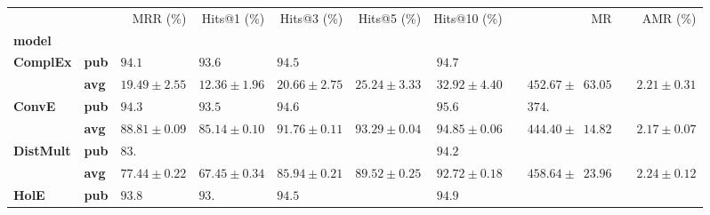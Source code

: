 \begin{tabular}{llrrrrrrr}
\toprule
       &     &                    MRR (\%) &                 Hits@1 (\%) &                 Hits@3 (\%) &                 Hits@5 (\%) &                Hits@10 (\%) &                                         MR &                     AMR (\%) \\
\textbf{model} & {} &                             &                             &                             &                             &                             &                                            &                              \\
\midrule
\textbf{ComplEx} & \textbf{pub} &  $94.1\phantom{0 \pm 0.00}$ &  $93.6\phantom{0 \pm 0.00}$ &  $94.5\phantom{0 \pm 0.00}$ &                             &  $94.7\phantom{0 \pm 0.00}$ &                                            &                              \\
       & \textbf{avg} &            $19.49 \pm 2.55$ &            $12.36 \pm 1.96$ &            $20.66 \pm 2.75$ &            $25.24 \pm 3.33$ &            $32.92 \pm 4.40$ &  $\phantom{00}452.67 \pm \phantom{0}63.05$ &  $\phantom{00}2.21 \pm 0.31$ \\\midrule
\textbf{ConvE} & \textbf{pub} &  $94.3\phantom{0 \pm 0.00}$ &  $93.5\phantom{0 \pm 0.00}$ &  $94.6\phantom{0 \pm 0.00}$ &                             &  $95.6\phantom{0 \pm 0.00}$ &  $\phantom{00}374.\phantom{00 \pm 000.00}$ &                              \\
       & \textbf{avg} &            $88.81 \pm 0.09$ &            $85.14 \pm 0.10$ &            $91.76 \pm 0.11$ &            $93.29 \pm 0.04$ &            $94.85 \pm 0.06$ &  $\phantom{00}444.40 \pm \phantom{0}14.82$ &  $\phantom{00}2.17 \pm 0.07$ \\\midrule
\textbf{DistMult} & \textbf{pub} &  $83.\phantom{00 \pm 0.00}$ &                             &                             &                             &  $94.2\phantom{0 \pm 0.00}$ &                                            &                              \\
       & \textbf{avg} &            $77.44 \pm 0.22$ &            $67.45 \pm 0.34$ &            $85.94 \pm 0.21$ &            $89.52 \pm 0.25$ &            $92.72 \pm 0.18$ &  $\phantom{00}458.64 \pm \phantom{0}23.96$ &  $\phantom{00}2.24 \pm 0.12$ \\\midrule
\textbf{HolE} & \textbf{pub} &  $93.8\phantom{0 \pm 0.00}$ &  $93.\phantom{00 \pm 0.00}$ &  $94.5\phantom{0 \pm 0.00}$ &                             &  $94.9\phantom{0 \pm 0.00}$ &                                            &                              \\

\end{tabular}
